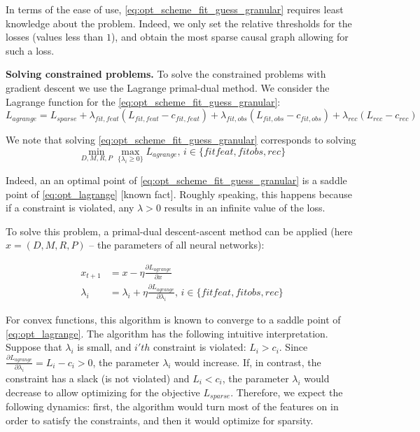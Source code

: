 \documentclass[a4paper,11pt,oneside]{report}
\begin{document}
In terms of the ease of use, \autoref{eq:opt_scheme_fit_guess_granular} requires least knowledge about the problem. Indeed, we only set the relative thresholds for the losses (values less than $1$), and obtain the most sparse causal graph allowing for such a loss.

{\bf Solving constrained problems.} To solve the constrained problems with gradient descent we use the Lagrange primal-dual method. We consider the Lagrange function for the \autoref{eq:opt_scheme_fit_guess_granular}:
$$
L_{agrange}=L_{sparse}+\lambda_{fit, feat}(L_{fit, feat}-c_{fit, feat})+\lambda_{fit, obs}(L_{fit, obs}-c_{fit, obs})+\lambda_{rec}(L_{rec}-c_{rec})
$$

We note that solving \autoref{eq:opt_scheme_fit_guess_granular} corresponds to solving
\begin{equation}
\label{eq:opt_lagrange}
\min\limits_{D,M,R,P}\max\limits_{\{\lambda_i\geq 0\}}L_{agrange},\,i\in\{fitfeat, fitobs, rec\}
\end{equation}

Indeed, an an optimal point of \autoref{eq:opt_scheme_fit_guess_granular} is a saddle point of \autoref{eq:opt_lagrange} [known fact]. Roughly speaking, this happens because if a constraint is violated, any $\lambda>0$ results in an infinite value of the loss.

To solve this problem, a primal-dual descent-ascent method can be applied (here $x=(D,M,R,P)$ -- the parameters of all neural networks):

\begin{equation}
\label{eq:primaldual}
\begin{array}{rl}
x_{t+1}&=x-\eta\frac{\partial L_{agrange}}{\partial x}\\
\lambda_i&=\lambda_i+\eta\frac{\partial L_{agrange}}{\partial \lambda_i},\,i\in\{fitfeat,fitobs,rec\}
\end{array}
\end{equation}

For convex functions, this algorithm is known to converge to a saddle point of \autoref{eq:opt_lagrange}. The algorithm has the following intuitive interpretation. Suppose that $\lambda_i$ is small, and $i'th$ constraint is violated: $L_i>c_i$. Since $\frac{\partial L_{agrange}}{\partial \lambda_i}=L_i-c_i>0$, the parameter $\lambda_i$ would increase. If, in contrast, the constraint has a slack (is not violated) and $L_i<c_i$, the parameter $\lambda_i$ would decrease to allow optimizing for the objective $L_{sparse}$.
Therefore, we expect the following dynamics: first, the algorithm would turn most of the features on in order to satisfy the constraints, and then it would optimize for sparsity.
\end{document}
